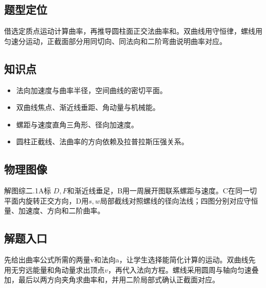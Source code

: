 \documentclass[UTF8,fontset=fandol,a4paper,11pt]{ctexart}
\begin{document}


\subsection*{题型定位}

借选定质点运动计算曲率，再推导圆柱面正交法曲率和。双曲线用守恒律，螺线用匀速分运动，正截面部分用同切向、同法向和二阶弯曲说明曲率对应。



\subsection*{知识点}

\begin{itemize}
\item 法向加速度与曲率半径，空间曲线的密切平面。
\item 双曲线焦点、渐近线垂距、角动量与机械能。
\item 螺距与速度直角三角形、径向加速度。
\item 圆柱正截线、法曲率的方向依赖及拉普拉斯压强关系。
\end{itemize}



\subsection*{物理图像}

解图综二.1A标 $D,F$和渐近线垂足，B用一周展开图联系螺距与速度。C在同一切平面内旋转正交方向，D用$s,w$局部截线对照螺线的径向法线；四图分别对应守恒量、加速度、方向和二阶曲率。



\subsection*{解题入口}

先给出曲率公式所需的两量v和法向a，让学生选择能简化计算的运动。双曲线先用无穷远能量和角动量求出顶点$v$，再代入法向方程。螺线采用圆周与轴向匀速叠加，最后以两方向夹角求曲率和，并用二阶局部式确认正截面对应。

\end{document}
